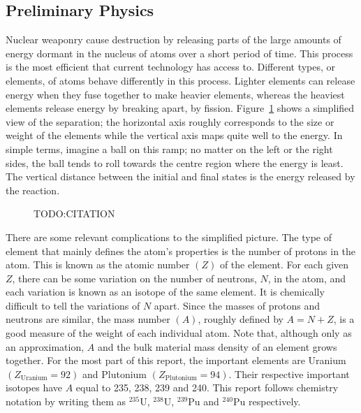 \documentclass[twoside,titlepage,11pt,twocolumn,a4paper]{article}
\begin{document}
\subsection{Preliminary Physics}
Nuclear weaponry cause destruction by releasing parts of the large
amounts of energy dormant in the nucleus of atoms over a short period
of time. This process is the most efficient that current technology
has access to. Different types, or elements, of atoms behave
differently in this process. Lighter elements can release energy when
they fuse together to make heavier elements, whereas the heaviest
elements release energy by breaking apart, by
fission. Figure~\ref{nuclearBindingEnergyBowl} shows a simplified view
of the separation; the horizontal axis roughly corresponds to the size
or weight of the elements while the vertical axis maps quite well to
the energy. In simple terms, imagine a ball on this ramp; no matter on
the left or the right sides, the ball tends to roll towards the centre
region where the energy is least. The vertical distance between the
initial and final states is the energy released by the reaction.

\begin{figure}
  \caption{TODO:CITATION}
  \label{nuclearBindingEnergyBowl}
\end{figure}

There are some relevant complications to the simplified picture. The
type of element that mainly defines the atom's properties is the
number of protons in the atom. This is known as the atomic number \(
\left ( Z \right ) \) of the element. For each given \(Z\), there can
be some variation on the number of neutrons, \(N\), in the atom, and
each variation is known as an isotope of the same element. It is
chemically difficult to tell the variations of \(N\) apart. Since the
masses of protons and neutrons are similar, the mass number \( \left (
A \right ) \), roughly defined by \(A=N+Z\), is a good measure of the
weight of each individual atom. Note that, although only as an
approximation, \(A\) and the bulk material mass density of an element
grows together. For the most part of this report, the important
elements are Uranium \( \left ( Z_{\textrm{Uranium}} = 92 \right ) \)
and Plutonium \( \left ( Z_{\textrm{Plutonium}} = 94 \right )
\). Their respective important isotopes have \(A\) equal to 235, 238,
239 and 240. This report follows chemistry notation by writing them as
\( \mathrm{^{235}U} \), \( \mathrm{^{238}U} \), \( \mathrm{^{239}Pu}
\) and \( \mathrm{^{240}Pu} \) respectively.
\end{document}
